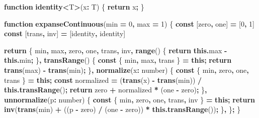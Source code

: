 \documentclass[
]{book}
\newenvironment{Shaded}{\begin{snugshade}}{\end{snugshade}}
\newcommand{\AttributeTok}[1]{\textcolor[rgb]{0.13,0.29,0.53}{#1}}
\newcommand{\ControlFlowTok}[1]{\textcolor[rgb]{0.13,0.29,0.53}{\textbf{#1}}}
\newcommand{\DataTypeTok}[1]{\textcolor[rgb]{0.13,0.29,0.53}{#1}}
\newcommand{\DecValTok}[1]{\textcolor[rgb]{0.00,0.00,0.81}{#1}}
\newcommand{\FunctionTok}[1]{\textcolor[rgb]{0.13,0.29,0.53}{\textbf{#1}}}
\newcommand{\KeywordTok}[1]{\textcolor[rgb]{0.13,0.29,0.53}{\textbf{#1}}}
\newcommand{\NormalTok}[1]{#1}
\newcommand{\OperatorTok}[1]{\textcolor[rgb]{0.81,0.36,0.00}{\textbf{#1}}}
\theoremstyle{definition}
\theoremstyle{definition}
\theoremstyle{definition}
\theoremstyle{definition}
\theoremstyle{remark}
\begin{document}
\begin{Shaded}
\begin{Highlighting}[]

\KeywordTok{function} \FunctionTok{identity}\OperatorTok{\textless{}}\NormalTok{T}\OperatorTok{\textgreater{}}\NormalTok{(x}\OperatorTok{:}\NormalTok{ T) \{}
  \ControlFlowTok{return}\NormalTok{ x}\OperatorTok{;}
\NormalTok{\}}

\KeywordTok{function} \FunctionTok{expanseContinuous}\NormalTok{(min }\OperatorTok{=} \DecValTok{0}\OperatorTok{,}\NormalTok{ max }\OperatorTok{=} \DecValTok{1}\NormalTok{) \{}
  \KeywordTok{const}\NormalTok{ [zero}\OperatorTok{,}\NormalTok{ one] }\OperatorTok{=}\NormalTok{ [}\DecValTok{0}\OperatorTok{,} \DecValTok{1}\NormalTok{]}
  \KeywordTok{const}\NormalTok{ [trans}\OperatorTok{,}\NormalTok{ inv] }\OperatorTok{=}\NormalTok{ [identity}\OperatorTok{,}\NormalTok{ identity]}
  
  \ControlFlowTok{return}\NormalTok{ \{ min}\OperatorTok{,}\NormalTok{ max}\OperatorTok{,}\NormalTok{ zero}\OperatorTok{,}\NormalTok{ one}\OperatorTok{,}\NormalTok{ trans}\OperatorTok{,}\NormalTok{ inv}\OperatorTok{,}
    \FunctionTok{range}\NormalTok{() \{}
      \ControlFlowTok{return} \KeywordTok{this}\OperatorTok{.}\AttributeTok{max} \OperatorTok{{-}} \KeywordTok{this}\OperatorTok{.}\AttributeTok{min}\OperatorTok{;}
\NormalTok{    \}}\OperatorTok{,}
    \FunctionTok{transRange}\NormalTok{() \{}
      \KeywordTok{const}\NormalTok{ \{ min}\OperatorTok{,}\NormalTok{ max}\OperatorTok{,}\NormalTok{ trans \} }\OperatorTok{=} \KeywordTok{this}\OperatorTok{;}
      \ControlFlowTok{return} \FunctionTok{trans}\NormalTok{(max) }\OperatorTok{{-}} \FunctionTok{trans}\NormalTok{(min)}\OperatorTok{;}
\NormalTok{    \}}\OperatorTok{,}
    \FunctionTok{normalize}\NormalTok{(x}\OperatorTok{:} \DataTypeTok{number}\NormalTok{) \{}
      \KeywordTok{const}\NormalTok{ \{ min}\OperatorTok{,}\NormalTok{ zero}\OperatorTok{,}\NormalTok{ one}\OperatorTok{,}\NormalTok{ trans \} }\OperatorTok{=} \KeywordTok{this}\OperatorTok{;}
      \KeywordTok{const}\NormalTok{ normalized }\OperatorTok{=}\NormalTok{ (}\FunctionTok{trans}\NormalTok{(x) }\OperatorTok{{-}} \FunctionTok{trans}\NormalTok{(min)) }\OperatorTok{/} \KeywordTok{this}\OperatorTok{.}\FunctionTok{transRange}\NormalTok{()}\OperatorTok{;}
      \ControlFlowTok{return}\NormalTok{ zero }\OperatorTok{+}\NormalTok{ normalized }\OperatorTok{*}\NormalTok{ (one }\OperatorTok{{-}}\NormalTok{ zero)}\OperatorTok{;}
\NormalTok{    \}}\OperatorTok{,}
    \FunctionTok{unnormalize}\NormalTok{(p}\OperatorTok{:} \DataTypeTok{number}\NormalTok{) \{}
      \KeywordTok{const}\NormalTok{ \{ min}\OperatorTok{,}\NormalTok{ zero}\OperatorTok{,}\NormalTok{ one}\OperatorTok{,}\NormalTok{ trans}\OperatorTok{,}\NormalTok{ inv \} }\OperatorTok{=} \KeywordTok{this}\OperatorTok{;}
      \ControlFlowTok{return} \FunctionTok{inv}\NormalTok{(}\FunctionTok{trans}\NormalTok{(min) }\OperatorTok{+}\NormalTok{ ((p }\OperatorTok{{-}}\NormalTok{ zero) }\OperatorTok{/}\NormalTok{ (one }\OperatorTok{{-}}\NormalTok{ zero)) }\OperatorTok{*} \KeywordTok{this}\OperatorTok{.}\FunctionTok{transRange}\NormalTok{())}\OperatorTok{;}
\NormalTok{    \}}\OperatorTok{,}
\NormalTok{  \}}\OperatorTok{;}
\NormalTok{\}}


\end{Highlighting}
\end{Shaded}
\end{document}
